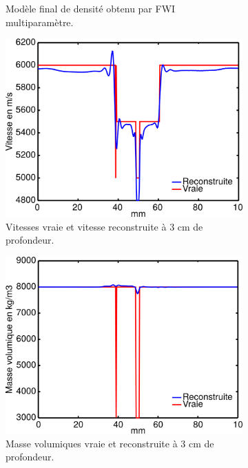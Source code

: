 \begin{figure}[!h]
\begin{subfigure}[b]{0.35\textwidth}
		\caption{Modèle final de densité obtenu par FWI multiparamètre.}
	\end{subfigure}
	\begin{subfigure}[b]{0.35\textwidth}
		\includegraphics[width=\textwidth]{img/multi_param/coupe_vp_multi.png}
		\caption{Vitesses vraie et vitesse reconstruite à 3 cm de profondeur.}
	\end{subfigure}
	\begin{subfigure}[b]{0.35\textwidth}
		\includegraphics[width=\textwidth]{img/multi_param/coupe_rho_multi.png}
		\caption{Masse volumiques vraie et reconstruite à 3 cm de profondeur.}
	\end{subfigure}
	\begin{subfigure}[b]{0.35\textwidth}

\end{subfigure}
\end{figure}
